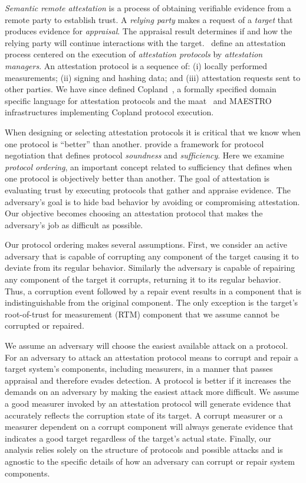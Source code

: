 \documentclass[runningheads]{llncs}
\theoremstyle{definition}
\begin{document}
\emph{Semantic remote
  attestation}\citep{Haldar:04:Semantic-Remote,coker2011principles} is
a process of obtaining verifiable evidence from a remote party to
establish trust.  A \emph{relying party} makes a request of a
\emph{target} that produces evidence for \emph{appraisal}. The
appraisal result determines if and how the relying party will continue
interactions with the target.  \citet{Coker::Principles-of-R}~define
an attestation process centered on the execution of \emph{attestation
  protocols} by \emph{attestation managers}.  An attestation protocol
is a sequence of: (i) locally performed measurements; (ii) signing and
hashing data; and (iii) attestation requests sent to other parties.
We have since defined Copland~\citep{Rowe:2019:Orchestrating}, a
formally specified domain specific language for attestation protocols
and the maat~\citep{Pendergrass:2018:Maat} and
MAESTRO~\citep{Petz:2021:faithful} infrastructures implementing
Copland protocol execution.

When designing or selecting attestation protocols it is critical that
we know when one protocol is ``better'' than another.
\citet{Fritz:2023:framework} provide a framework for protocol
negotiation that defines protocol \emph{soundness} and
\emph{sufficiency}.  Here we examine \emph{protocol ordering}, an
important concept related to sufficiency that defines when one
protocol is objectively better than another.  The goal of attestation
is evaluating trust by executing protocols that gather and appraise
evidence.  The adversary's goal is to hide bad behavior by avoiding or
compromising attestation.  Our objective becomes choosing an
attestation protocol that makes the adversary's job as difficult as
possible.

Our protocol ordering makes several assumptions. First, we consider an
active adversary that is capable of corrupting any component of the
target causing it to deviate from its regular behavior.  Similarly the
adversary is capable of repairing any component of the target it
corrupts, returning it to its regular behavior. Thus, a corruption
event followed by a repair event results in a component that is
indistinguishable from the original component. The only exception is
the target's root-of-trust for measurement (RTM) component that we
assume cannot be corrupted or repaired.

We assume an adversary will choose the easiest available attack on a
protocol.  For an adversary to attack an attestation protocol means to
corrupt and repair a target system's components, including measurers,
in a manner that passes appraisal and therefore evades detection.  A
protocol is better if it increases the demands on an adversary by
making the easiest attack more difficult.  We assume a good measurer
invoked by an attestation protocol will generate evidence that
accurately reflects the corruption state of its target.  A corrupt
measurer or a measurer dependent on a corrupt component will always
generate evidence that indicates a good target regardless of the
target's actual state.  Finally, our analysis relies solely on the
structure of protocols and possible attacks and is agnostic to the
specific details of how an adversary can corrupt or repair system
components.
\end{document}
